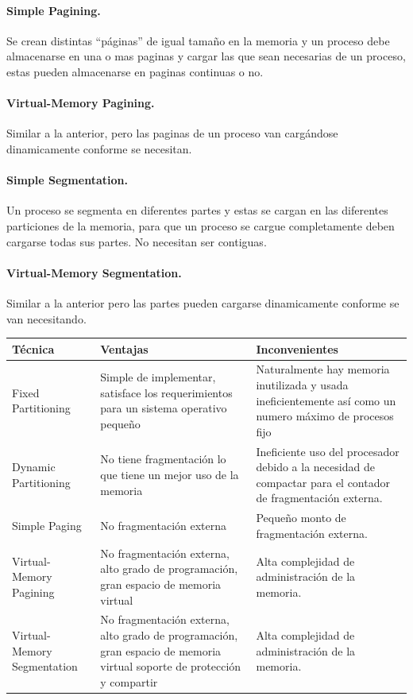 \documentclass[spanish,12pt,letterpapper]{article}
\begin{document}
	\paragraph{Simple Pagining.} Se crean distintas ``páginas'' de igual tamaño en la memoria y un proceso debe almacenarse en una o mas paginas y cargar las que sean necesarias de un proceso, estas pueden almacenarse en paginas continuas o no.
	
	\paragraph{Virtual-Memory Pagining.} Similar a la anterior, pero las paginas de un proceso van cargándose dinamicamente conforme se necesitan.
	
	\paragraph{Simple Segmentation.} Un proceso se segmenta en diferentes partes y estas se cargan en las diferentes particiones de la memoria, para que un proceso se cargue completamente deben cargarse todas sus partes. No necesitan ser contiguas.
	
	\paragraph{Virtual-Memory Segmentation.}	 Similar a la anterior pero las partes pueden cargarse dinamicamente conforme se van necesitando.
	
	\begin{center}
	\begin{tabular}{|p{4cm}|p{4cm}|p{4cm}|}
	\hline
	\textbf{Técnica} & \textbf{Ventajas} & \textbf{Inconvenientes}\\
	\hline
	Fixed Partitioning & Simple de implementar, satisface los requerimientos para un sistema operativo pequeño & Naturalmente hay memoria inutilizada y usada ineficientemente así como un numero máximo de procesos fijo  \\
	\hline
	Dynamic Partitioning & No tiene fragmentación lo que tiene un mejor uso de la memoria & Ineficiente uso del procesador debido a la necesidad de compactar para el contador de fragmentación externa.\\
	\hline
	Simple Paging & No fragmentación externa & Pequeño monto de fragmentación externa.\\
	\hline
	Virtual-Memory Pagining & No fragmentación externa, alto grado de programación, gran espacio de memoria virtual & Alta complejidad de administración de la memoria.\\
	\hline
	Virtual-Memory Segmentation & No fragmentación externa, alto grado de programación, gran espacio de memoria virtual soporte de protección y compartir & Alta complejidad de administración de la memoria.\\
	\hline
	\end{tabular}
	\end{center}	
	
\end{document}

